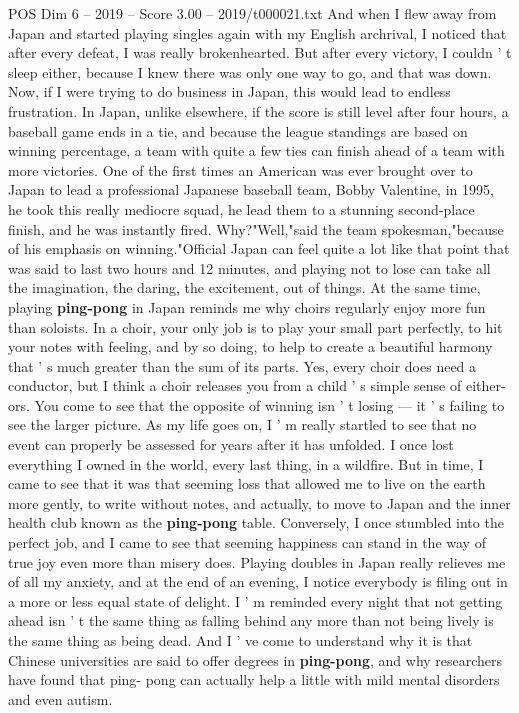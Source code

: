 \begin{textsample}{POS Dim 6 – 2019 – Score 3.00 – 2019/t000021.txt}
And when I flew away from Japan and started playing singles again with my English archrival, I noticed that after every defeat, I was really brokenhearted.
But after every victory, I couldn ' t sleep either, because I knew there was only one way to go, and that was down.
Now, if I were trying to do business in Japan, this would lead to endless frustration.
In Japan, unlike elsewhere, if the score is still level after four hours, a baseball game ends in a tie, and because the league standings are based on winning percentage, a team with quite a few ties can finish ahead of a team with more victories.
One of the first times an American was ever brought over to Japan to lead a professional Japanese baseball team, Bobby Valentine, in 1995, he took this really mediocre squad, he lead them to a stunning second-place finish, and he was instantly fired.
Why?"Well,"said the team spokesman,"because of his emphasis on winning."Official Japan can feel quite a lot like that point that was said to last two hours and 12 minutes, and playing not to lose can take all the imagination, the daring, the excitement, out of things.
At the same time, playing \textbf{ping-pong} in Japan reminds me why choirs regularly enjoy more fun than soloists.
In a choir, your only job is to play your small part perfectly, to hit your notes with feeling, and by so doing, to help to create a beautiful harmony that ' s much greater than the sum of its parts.
Yes, every choir does need a conductor, but I think a choir releases you from a child ' s simple sense of either-ors.
You come to see that the opposite of winning isn ' t losing — it ' s failing to see the larger picture.
As my life goes on, I ' m really startled to see that no event can properly be assessed for years after it has unfolded.
I once lost everything I owned in the world, every last thing, in a wildfire.
But in time, I came to see that it was that seeming loss that allowed me to live on the earth more gently, to write without notes, and actually, to move to Japan and the inner health club known as the \textbf{ping-pong} table.
Conversely, I once stumbled into the perfect job, and I came to see that seeming happiness can stand in the way of true joy even more than misery does.
Playing doubles in Japan really relieves me of all my anxiety, and at the end of an evening, I notice everybody is filing out in a more or less equal state of delight.
I ' m reminded every night that not getting ahead isn ' t the same thing as falling behind any more than not being lively is the same thing as being dead.
And I ' ve come to understand why it is that Chinese universities are said to offer degrees in \textbf{ping-pong}, and why researchers have found that ping- pong can actually help a little with mild mental disorders and even autism.

\end{textsample}
